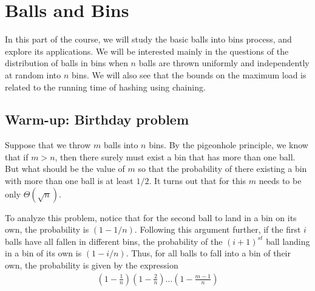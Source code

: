 \chapter{Balls and Bins}

In this part of the course, we will study the basic balls into bins process, and explore its applications. We will be interested mainly in the questions of the distribution of balls in bins when $n$ balls are thrown uniformly and independently at random into $n$ bins. We will also see that the bounds on the maximum load is related to the running time of hashing using chaining. 

\section{Warm-up: Birthday problem}

Suppose that we throw $m$ balls into $n$ bins. By the pigeonhole principle, we know that if $m > n$, then there surely must exist a bin that has more than one ball. But what should be the value of $m$ so that the probability of there existing a bin with more than one ball is at least $1/2$. It turns out that for this $m$ needs to be only $\Theta(\sqrt{n})$. 

To analyze this problem, notice that for the second ball to land in a bin on its own, the probability is $(1 - 1/n)$. Following this argument further, if the first $i$ balls have all fallen in different bins, the probability of the $(i+1)^{st}$ ball landing in a bin of its own is $(1 - i/n)$. Thus, for all balls to fall into a bin of their own, the probability is given by the expression
\begin{align*}
	\left(1 - \frac{1}{n}\right) \left( 1 - \frac{2}{n}\right) \ldots \left(1 - \frac{m-1}{n}\right)
\end{align*}